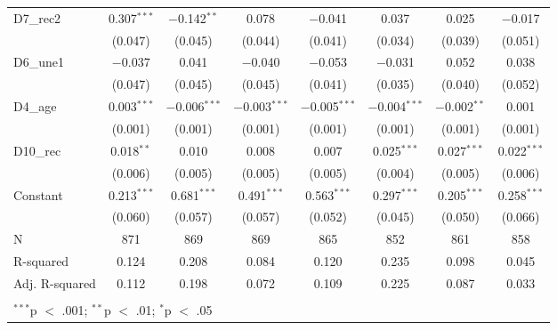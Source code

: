 \documentclass[
]{article}
\begin{document}
\begin{table}[!htbp]
\begin{tabular}{@{\extracolsep{5pt}}lccccccc}
  D7\_rec2 & 0.307$^{***}$ & $-$0.142$^{**}$ & 0.078 & $-$0.041 & 0.037 & 0.025 & $-$0.017 \\ 
  & (0.047) & (0.045) & (0.044) & (0.041) & (0.034) & (0.039) & (0.051) \\ 
  D6\_une1 & $-$0.037 & 0.041 & $-$0.040 & $-$0.053 & $-$0.031 & 0.052 & 0.038 \\ 
  & (0.047) & (0.045) & (0.045) & (0.041) & (0.035) & (0.040) & (0.052) \\ 
  D4\_age & 0.003$^{***}$ & $-$0.006$^{***}$ & $-$0.003$^{***}$ & $-$0.005$^{***}$ & $-$0.004$^{***}$ & $-$0.002$^{**}$ & 0.001 \\ 
  & (0.001) & (0.001) & (0.001) & (0.001) & (0.001) & (0.001) & (0.001) \\ 
  D10\_rec & 0.018$^{**}$ & 0.010 & 0.008 & 0.007 & 0.025$^{***}$ & 0.027$^{***}$ & 0.022$^{***}$ \\ 
  & (0.006) & (0.005) & (0.005) & (0.005) & (0.004) & (0.005) & (0.006) \\ 
  Constant & 0.213$^{***}$ & 0.681$^{***}$ & 0.491$^{***}$ & 0.563$^{***}$ & 0.297$^{***}$ & 0.205$^{***}$ & 0.258$^{***}$ \\ 
  & (0.060) & (0.057) & (0.057) & (0.052) & (0.045) & (0.050) & (0.066) \\ 
 N & 871 & 869 & 869 & 865 & 852 & 861 & 858 \\ 
R-squared & 0.124 & 0.208 & 0.084 & 0.120 & 0.235 & 0.098 & 0.045 \\ 
Adj. R-squared & 0.112 & 0.198 & 0.072 & 0.109 & 0.225 & 0.087 & 0.033 \\ 
\hline \\[-1.8ex] 
\multicolumn{8}{l}{$^{***}$p $<$ .001; $^{**}$p $<$ .01; $^{*}$p $<$ .05} \\ 
\end{tabular} 
\end{table}
\end{document}
